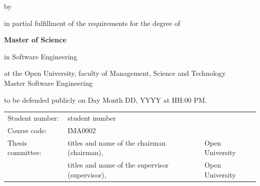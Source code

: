 \begin{titlepage}

\begin{center}


\vspace*{2\bigskipamount}

{\makeatletter
\titlestyle\color{red}\Huge\@title
\makeatother}

{\makeatletter
\ifx\@subtitle\undefined\else
    \bigskip
    \titlefont\titleshape\LARGE\@subtitle
\fi
\makeatother}

\bigskip
\bigskip

by

\bigskip
\bigskip

{\makeatletter
\titlefont\Large\bfseries\@author
\makeatother}

\vfill

in partial fulfillment of the requirements for the degree of

\bigskip
\bigskip

{\bfseries Master of Science}

in Software Engineering

\bigskip
\bigskip

at the Open University, faculty of Management, Science and Technology \\
Master Software Engineering

to be defended publicly on Day Month DD, YYYY at HH:00 PM.

\vfill

\begin{tabular}{lll}
    Student number: & student number \\
    Course code: & IMA0002\\
    Thesis committee:
        & titles and name of the chairman (chairman), & Open University \\
        & titles and name of the supervisor (supervisor), & Open University
\end{tabular}

\bigskip


\bigskip

\end{center}

\end{titlepage} 
